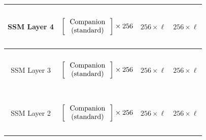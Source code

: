 \begin{table}[]
\begin{tabular}{@{}c|c|c|c@{}}
SSM Layer 4 & \begin{math}\begin{aligned}    \begin{matrix}    \text{\phantom{-}} \\    \end{matrix}    \\    \begin{bmatrix}    \text{\phantom{-} Companion \phantom{-}} \\ \text{(standard)} \\    \end{bmatrix}    \times 256     \\    \begin{matrix}    \text{\phantom{-}} \\    \end{matrix}    \\\end{aligned}\end{math}          & $256 \times \ell$ & $256 \times \ell$ \\ \midrule
SSM Layer 3 & \begin{math}\begin{aligned}    \begin{matrix}    \text{\phantom{-}} \\    \end{matrix}    \\    \begin{bmatrix}    \text{\phantom{-} Companion \phantom{-}} \\ \text{(standard)} \\    \end{bmatrix}    \times 256     \\    \begin{matrix}    \text{\phantom{-}} \\    \end{matrix}    \\\end{aligned}\end{math}          & $256 \times \ell$ & $256 \times \ell$ \\ \midrule
SSM Layer 2 & \begin{math}\begin{aligned}    \begin{matrix}    \text{\phantom{-}} \\    \end{matrix}    \\    \begin{bmatrix}    \text{\phantom{-} Companion \phantom{-}} \\ \text{(standard)} \\    \end{bmatrix}    \times 256     \\    \begin{matrix}    \text{\phantom{-}} \\    \end{matrix}    \\\end{aligned}\end{math}          & $256 \times \ell$ & $256 \times \ell$ \\ \midrule

\end{tabular}
\end{table}
